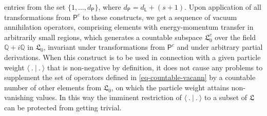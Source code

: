 \documentclass[11pt,twoside,openright]{report}
\theoremstyle{definition}
\theoremstyle{plain}
\theoremstyle{remark}
\theoremstyle{assumption}
\newcommand{\set}[1]{\{ #1 \}}
\newcommand{\scp}[2]{\langle #1 \vert #2 \rangle}
\newcommand{\Qbb}{\mathbb{Q}}
\newcommand{\Lfrak}{\mathfrak{L}}
\newcommand{\Lsf}{\mathsf{L}}
\newcommand{\Psf}{\mathsf{P}}
\newcommand{\Pcount}{\mathsf{P}^c}
\newcommand{\vaccount}{\mathfrak{L}_0^c}
\begin{document}
entries from the set $\set{1 , \dots , d_\Psf}$, where $d_\Psf =
d_\Lsf + ( s + 1 )$. Upon application of all transformations from
$\Pcount$ to these constructs, we get a sequence of vacuum
annihilation operators, comprising elements with energy-momentum
transfer in arbitrarily small regions, which generates a countable
subspace $\vaccount$ over the field $\Qbb + i \Qbb$ in $\Lfrak_0$,
invariant under transformations from $\Pcount$ and under arbitrary
partial derivations. When this construct is to be used in connection
with a given particle weight $\scp{~.~}{~.~}$ that is non-negative by
definition, it does not cause any problems to supplement the set of
operators defined in \eqref{eq-countable-vacann} by a countable number
of other elements from $\Lfrak_0$, on which the particle weight
attains non-vanishing values. In this way the imminent restriction of
$\scp{~.~}{~.~}$ to a subset of $\Lfrak$ can be protected from getting
trivial.
\end{document}
